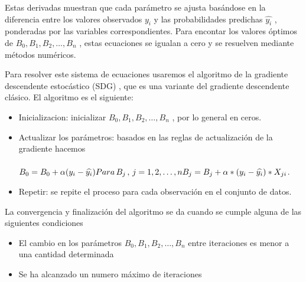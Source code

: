 Estas derivadas muestran que cada parámetro se ajusta basándose en la diferencia entre los valores
observados $y_i$ y las probabilidades predichas $\widehat{y_i}$ , ponderadas por las variables correspondientes. \medskip
Para encontar los valores óptimos de $ B_0 , B_1, B_2 , \dots,B_n $ , estas ecuaciones se igualan a cero y se resuelven mediante
métodos numéricos. \medskip

Para resolver este sistema de ecuaciones usaremos el algoritmo de la gradiente descendente estocástico (SDG) , que es una variante del gradiente descendente clásico. El algoritmo es el siguiente:\\

\begin{itemize}
    \item Inicializacion:  inicializar $ B_0 , B_1, B_2 , \dots,B_n $  , por lo general en ceros.\medskip
    
    
    \item Actualizar los parámetros: basados en las reglas de actualización de la gradiente hacemos \\ \\
    $B_0 = B_0 + \alpha (y_i - \widehat{y_i}) \\
    Para \, B_j \, , \,  j = 1,2,\dots,n  \\
    B_j = B_j + \alpha * (y_i - \widehat{y_i}) * X_{ji}$.\medskip
    
    \item Repetir: se repite el proceso para cada observación en el conjunto de datos.\medskip

       
\end{itemize} \medskip

La convergencia y finalización del algoritmo se da cuando se cumple alguna de las siguientes condiciones
\begin{itemize}
\item El cambio en los parámetros $ B_0 , B_1, B_2 , \dots,B_n $  entre iteraciones 
es menor a una cantidad determinada
\item Se ha alcanzado un numero máximo de iteraciones
\end{itemize}




